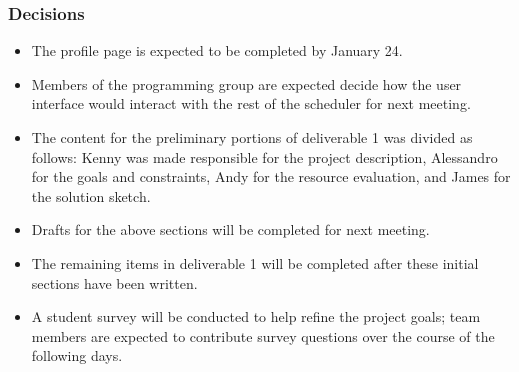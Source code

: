 \documentclass[paper=a4, fontsize=11pt]{scrartcl}
\begin{document}
\subsubsection*{Decisions}
\begin{itemize}
    \item The profile page is expected to be completed by January 24.
    \item Members of the programming group are expected decide how the user interface would
    interact with the rest of the scheduler for next meeting.
    \item The content for the preliminary portions of deliverable 1 was divided as follows: Kenny was made responsible for the project description, Alessandro for the goals and constraints, Andy for the resource evaluation, and James for the solution sketch.
    \item Drafts for the above sections will be completed for next meeting.
    \item The remaining items in deliverable 1 will be completed after these initial sections have been written.
    \item A student survey will be conducted to help refine the project goals; team members
    are expected to contribute survey questions over the course of the following days.
\end{itemize}

\subsection*{\color{red}{Next Meeting: Friday, January 29 11:00PM}}
\end{document}
